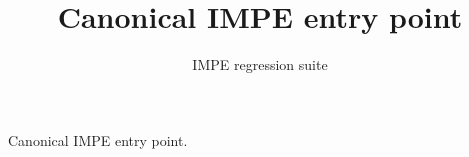 \documentclass{impeart}
\title{Canonical IMPE entry point}
\author{IMPE regression suite}
\begin{document}
\maketitle
Canonical IMPE entry point.
\end{document}
